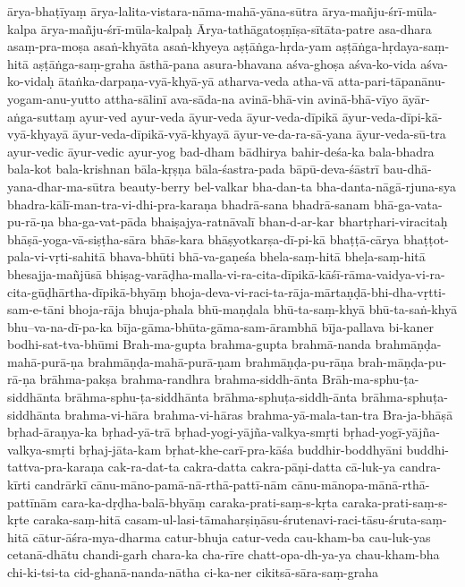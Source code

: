 {ārya-bhaṭīyaṃ
ārya-lalita-vistara-nāma-mahā-yāna-sūtra
ārya-mañju-śrī-mūla-kalpa
ārya-mañju-śrī-mūla-kalpaḥ
    Ārya-tathāgatoṣṇīṣa-sītāta-patre 
asa-dhara
asaṃ-pra-moṣa
asaṅ-khyāta
asaṅ-khyeya
    aṣṭāṅga-hṛda-yam
aṣṭāṅga-hṛdaya-saṃ-hitā
aṣṭāṅga-saṃ-graha
    āsthā-pana
asura-bhavana
aśva-ghoṣa
    aśva-ko-vida
    aśva-ko-vidaḥ
ātaṅka-darpaṇa-vyā-khyā-yā
    atharva-veda 
atha-vā
    atta-pari-tāpanānu-yogam-anu-yutto
attha-sālinī
ava-sāda-na
    avinā-bhā-vin
     avinā-bhā-vīyo
āyār-aṅga-suttaṃ
ayur-ved
ayur-veda
āyur-veda
āyur-veda-dīpikā
    āyur-veda-dīpi-kā-vyā-khyayā
āyur-veda-dīpikā-vyā-khyayā
āyur-ve-da-ra-sā-yana
āyur-veda-sū-tra
ayur-vedic
āyur-vedic
ayur-yog
bad-dham
bādhirya
bahir-deśa-ka
bala-bhadra
bala-kot
bala-krishnan
bāla-kṛṣṇa
     bāla-śastra-pada
bāpū-deva-śāstrī
bau-dhā-yana-dhar-ma-sūtra
beauty-berry
bel-valkar
    bha-dan-ta
    bha-danta-nāgā-rjuna-sya
bhadra-kālī-man-tra-vi-dhi-pra-karaṇa
bhadrā-sana
bhadrā-sanam
bhā-ga-vata-pu-rā-ṇa
bha-ga-vat-pāda
bhaiṣajya-ratnāvalī
bhan-d-ar-kar
bhartṛhari-viracitaḥ
bhāṣā-yoga-vā-siṣṭha-sāra
bhās-kara
    bhāṣyotkarṣa-dī-pi-kā 
bhaṭṭā-cārya
bhaṭṭot-pala-vi-vṛti-sahitā
    bhava-bhūti
    bhā-va-gaṇeśa
bhela-saṃ-hitā
bheḷa-saṃ-hitā
    bhesajja-mañjūsā
bhiṣag-varāḍha-malla-vi-ra-cita-dīpikā-kāśī-rāma-vaidya-vi-ra-cita-gūḍhārtha-dīpikā-bhyāṃ
bhoja-deva-vi-raci-ta-rāja-mārtaṇḍā-bhi-dha-vṛtti-sam-e-tāni
bhoja-rāja
bhuja-phala
bhū-maṇḍala
bhū-ta-saṃ-khyā
bhū-ta-saṅ-khyā
bhu--va-na-dī-pa-ka
    bīja-gāma-bhūta-gāma-sam-ārambhā
bīja-pallava
bi-kaner
bodhi-sat-tva-bhūmi
Brah-ma-gupta
brahma-gupta
brahmā-nanda
brahmāṇḍa-mahā-purā-ṇa
brahmāṇḍa-mahā-purā-ṇam
    brahmāṇḍa-pu-rāṇa 
brah-māṇḍa-pu-rā-ṇa
brāhma-pakṣa
brahma-randhra
brahma-siddh-ānta
Brāh-ma-sphu-ṭa-siddhānta
brāhma-sphu-ṭa-siddhānta
brāhma-sphuṭa-siddh-ānta
brāhma-sphuṭa-siddhānta
brahma-vi-hāra
brahma-vi-hāras
brahma-yā-mala-tan-tra
Bra-ja-bhāṣā
bṛhad-āraṇya-ka
bṛhad-yā-trā
bṛhad-yogi-yājña-valkya-smṛti
bṛhad-yogī-yājña-valkya-smṛti
bṛhaj-jāta-kam
bṛhat-khe-carī-pra-kāśa
    buddhir-boddhyāni
buddhi-tattva-pra-karaṇa
cak-ra-dat-ta
cakra-datta
cakra-pāṇi-datta
cā-luk-ya
    candra-kīrti
candrārkī
    cānu-māno-pamā-nā-rthā-pattī-nām 
    cānu-mānopa-mānā-rthā-pattīnām
    cara-ka-dṛḍha-balā-bhyāṃ
caraka-prati-saṃ-s-kṛta
caraka-prati-saṃ-s-kṛte
caraka-saṃ-hitā
casam-ul-lasi-tāmaharṣiṇāsu-śrutenavi-raci-tāsu-śruta-saṃ-hitā
   cātur-āśra-mya-dharma
catur-bhuja
catur-veda
cau-kham-ba
cau-luk-yas
   cetanā-dhātu
chandi-garh
chara-ka
cha-rīre
chatt-opa-dh-ya-ya
chau-kham-bha
chi-ki-tsi-ta
cid-ghanā-nanda-nātha
ci-ka-ner
cikitsā-sāra-saṃ-graha
}
